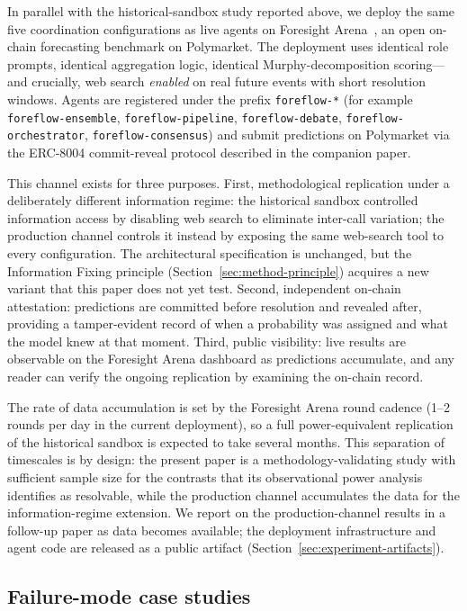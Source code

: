 \documentclass[11pt]{article}
\begin{document}
In parallel with the historical-sandbox study reported above, we deploy the same five coordination configurations as live agents on Foresight Arena~\citep{nechepurenko2026foresight}, an open on-chain forecasting benchmark on Polymarket. The deployment uses identical role prompts, identical aggregation logic, identical Murphy-decomposition scoring---and crucially, web search \emph{enabled} on real future events with short resolution windows. Agents are registered under the prefix \texttt{foreflow-*} (for example \texttt{foreflow-ensemble}, \texttt{foreflow-pipeline}, \texttt{foreflow-debate}, \texttt{foreflow-orchestrator}, \texttt{foreflow-consensus}) and submit predictions on Polymarket via the ERC-8004 commit-reveal protocol described in the companion paper.

This channel exists for three purposes. First, methodological replication under a deliberately different information regime: the historical sandbox controlled information access by disabling web search to eliminate inter-call variation; the production channel controls it instead by exposing the same web-search tool to every configuration. The architectural specification is unchanged, but the Information Fixing principle (Section~\ref{sec:method-principle}) acquires a new variant that this paper does not yet test. Second, independent on-chain attestation: predictions are committed before resolution and revealed after, providing a tamper-evident record of when a probability was assigned and what the model knew at that moment. Third, public visibility: live results are observable on the Foresight Arena dashboard as predictions accumulate, and any reader can verify the ongoing replication by examining the on-chain record.

The rate of data accumulation is set by the Foresight Arena round cadence (1--2 rounds per day in the current deployment), so a full power-equivalent replication of the historical sandbox is expected to take several months. This separation of timescales is by design: the present paper is a methodology-validating study with sufficient sample size for the contrasts that its observational power analysis identifies as resolvable, while the production channel accumulates the data for the information-regime extension. We report on the production-channel results in a follow-up paper as data becomes available; the deployment infrastructure and agent code are released as a public artifact (Section~\ref{sec:experiment-artifacts}).

\subsection{Failure-mode case studies}
\label{sec:results-cases}
\end{document}
